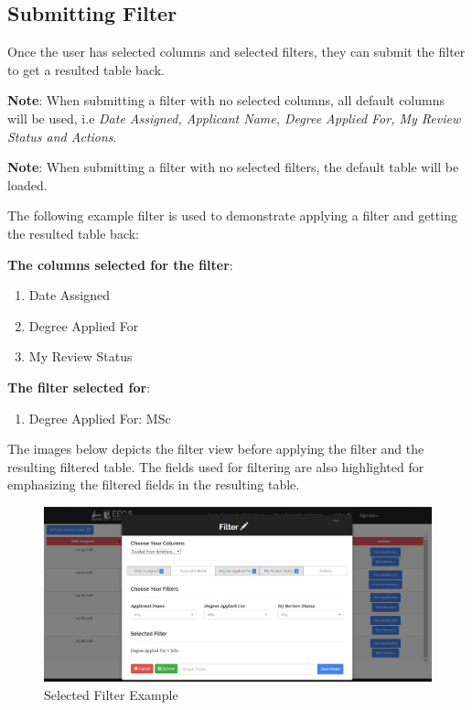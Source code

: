 \documentclass[fontsize=12pt,paper=letter,twoside]{scrartcl}
\begin{document}
\clearpage
\newpage
\subsection{Submitting Filter}

Once the user has selected columns and selected filters, they can submit the filter to get a resulted table back.

\bigskip
\noindent \textbf{Note}: When submitting a filter with no selected columns, all default columns will be used, i.e \emph{Date Assigned, Applicant Name, Degree Applied For, My Review Status and Actions}.

\bigskip
\noindent \textbf{Note}: When submitting a filter with no selected filters, the default table will be loaded.

\bigskip
\noindent The following example filter is used to demonstrate applying a filter and getting the resulted table back:

\bigskip
\noindent \textbf{The columns selected for the filter}:
\begin{enumerate}
\item Date Assigned
\item Degree Applied For
\item My Review Status
\end{enumerate}

\noindent \textbf{The filter selected for}:
\begin{enumerate}
\item Degree Applied For: MSc
\end{enumerate}

\bigskip
\noindent The images below depicts the filter view before applying the filter and the resulting filtered table. The fields used for filtering are also highlighted for emphasizing the filtered fields in the resulting table.

\begin{figure}[!htb]
\begin{center}
\includegraphics[width=.9\textwidth]{images/example_filter.png}
\end{center}
\caption{Selected Filter Example}
\label{fig:example_filter}
\end{figure}
\end{document}
